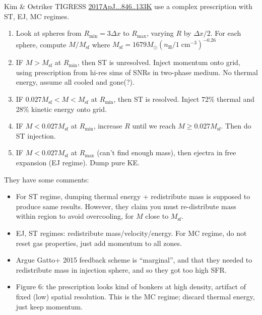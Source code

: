 \documentclass[10pt]{article}
\newcommand*{\mt}{\mathrm}
\newcommand*{\unit}[1]{\;\mt{#1}}  %
\newcommand*{\sun}{\odot}
\begin{document}
Kim \& Ostriker TIGRESS
\href{https://ui.adsabs.harvard.edu/abs/2017ApJ...846..133K/abstract}{2017ApJ...846..133K}
use a complex prescription with ST, EJ, MC regimes.
\begin{enumerate}
    \item Look at spheres from $R_\mt{min} = 3\Delta x$ to $R_\mt{max}$,
        varying $R$ by $\Delta x/2$.  For each sphere, compute $M/M_\mt{sf}$
        where $M_\mt{sf} = 1679 M_\sun \left(n_\mt{H}/1\unit{cm^{-3}}\right)^{-0.26}$
    \item IF $M > M_\mt{sf}$ at $R_\mt{min}$, then ST is unresolved.
        Inject momentum onto grid, using prescription from hi-res sims of SNRs
        in two-phase medium.  No thermal energy, assume all cooled and gone(?).
    \item IF $0.027 M_\mt{sf} < M < M_\mt{sf}$ at $R_\mt{min}$, then ST is
        resolved.  Inject 72\% thermal and 28\% kinetic energy onto grid.
    \item IF $M < 0.027 M_\mt{sf}$ at $R_\mt{min}$, increase $R$ until we reach
        $M \geq 0.027 M_\mt{sf}$.  Then do ST injection.
    \item IF $M < 0.027 M_\mt{sf}$ at $R_\mt{max}$ (can't find enough mass),
        then ejectra in free expansion (EJ regime).  Dump pure KE.
\end{enumerate}
They have some comments:
\begin{itemize}
    \item For ST regime, dumping thermal energy + redistribute mass is supposed
        to produce same results.  However, they claim you must re-distribute
        mass within region to avoid overcooling, for $M$ close to $M_\mt{sf}$.
    \item EJ, ST regimes: redistribute mass/velocity/energy.  For MC regime,
        do not reset gas properties, just add momentum to all zones.
    \item Argue Gatto+ 2015 feedback scheme is ``marginal'', and that they
        needed to redistribute mass in injection sphere, and so they got too
        high SFR.
    \item Figure 6: the prescription looks kind of bonkers at high density,
        artifact of fixed (low) spatial resolution.
        This is the MC regime; discard thermal energy, just keep momentum.
\end{itemize}
\end{document}
